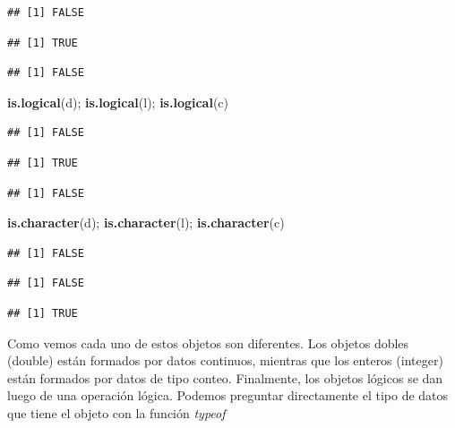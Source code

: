 \documentclass[]{article}
\newenvironment{Shaded}{\begin{snugshade}}{\end{snugshade}}
\newcommand{\KeywordTok}[1]{\textcolor[rgb]{0.13,0.29,0.53}{\textbf{{#1}}}}
\newcommand{\NormalTok}[1]{{#1}}
\begin{document}
\begin{verbatim}
## [1] FALSE
\end{verbatim}

\begin{verbatim}
## [1] TRUE
\end{verbatim}

\begin{verbatim}
## [1] FALSE
\end{verbatim}

\begin{Shaded}
\begin{Highlighting}[]
\KeywordTok{is.logical}\NormalTok{(d); }\KeywordTok{is.logical}\NormalTok{(l); }\KeywordTok{is.logical}\NormalTok{(c)}
\end{Highlighting}
\end{Shaded}

\begin{verbatim}
## [1] FALSE
\end{verbatim}

\begin{verbatim}
## [1] TRUE
\end{verbatim}

\begin{verbatim}
## [1] FALSE
\end{verbatim}

\begin{Shaded}
\begin{Highlighting}[]
\KeywordTok{is.character}\NormalTok{(d); }\KeywordTok{is.character}\NormalTok{(l); }\KeywordTok{is.character}\NormalTok{(c)}
\end{Highlighting}
\end{Shaded}

\begin{verbatim}
## [1] FALSE
\end{verbatim}

\begin{verbatim}
## [1] FALSE
\end{verbatim}

\begin{verbatim}
## [1] TRUE
\end{verbatim}

Como vemos cada uno de estos objetos son diferentes. Los objetos dobles
(double) están formados por datos continuos, mientras que los enteros
(integer) están formados por datos de tipo conteo. Finalmente, los
objetos lógicos se dan luego de una operación lógica. Podemos preguntar
directamente el tipo de datos que tiene el objeto con la función
\emph{typeof}
\end{document}
